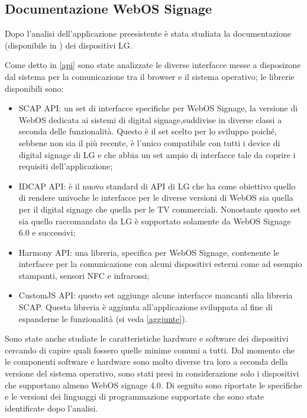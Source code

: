 \subsection{Documentazione WebOS Signage}\label{WebOS_doc}

Dopo l'analisi dell'applicazione preesistente è stata studiata la documentazione (disponibile in \cite{LgDoc}) dei dispositivi LG.

Come detto in \ref*{api} sono state analizzate le diverse interfacce messe a disposizone dal sistema per la comunicazione tra il browser e il sistema operativo; le librerie disponibili sono: 
\begin{itemize}
    \item SCAP API: un set di interfacce specifiche per WebOS Signage, la versione di WebOS dedicata ai sistemi di digital signage,suddivise in diverse classi a seconda delle funzionalità. Questo è il set scelto per lo sviluppo poiché, sebbene non sia il più recente, è l'unico compatibile con tutti i device di digital signage di LG e che abbia un set ampio di interfacce tale da coprire i requisiti dell'applicazione;
    \item IDCAP API: è il nuovo standard di API di LG che ha come obiettivo quello di rendere univoche le interfacce per le diverse versioni di WebOS sia quella per il digital signage che quella per le TV commerciali. Nonostante questo set sia quello raccomandato da LG è supportato solamente da WebOS Signage 6.0 e successivi;
    \item Harmony API: una libreria, specifica per WebOS Signage, contenente le interfacce per la comunicazione con alcuni dispositivi esterni come ad esempio stampanti, sensori NFC e infrarossi;
    \item CustomJS API: questo set aggiunge alcune interfacce mancanti alla libreria SCAP. Questa libreria è aggiunta all'applicazione sviluppata al fine di espanderne le funzionalità (si veda \ref*{aggiunte}).
\end{itemize}

Sono state anche studiate le caratteristiche hardware e software dei dispositivi cercando di capire quali fossero quelle minime comuni a tutti. Dal momento che le componenti software e hardware sono molto diverse tra loro a seconda della versione del sistema operativo, sono stati presi in considerazione solo i dispositivi che supportano almeno WebOS signage 4.0. Di seguito sono riportate le specifiche e le versioni dei linguaggi di programmazione supportate che sono state identificate dopo l'analisi.


